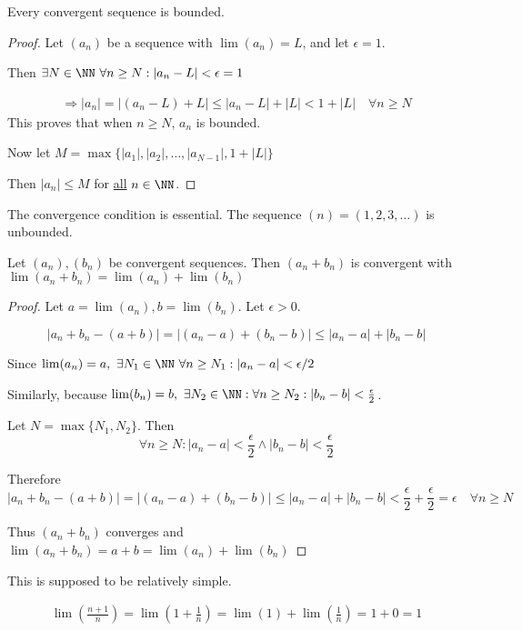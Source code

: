 \documentclass[class=scrartcl, crop=false]{standalone}
\begin{document}
\begin{theorem}
  Every convergent sequence is bounded.

  \begin{proof}
    Let $(a_n)$ be a sequence with $\lim(a_n) = L$, and let $\epsilon = 1$.

    Then $\exists N \in \NN \ \forall n \geq N: |a_n - L| < \epsilon = 1$

     \begin{gather*}
       \Rightarrow |a_n| = |(a_n - L) + L| \leq |a_n - L| + |L| < 1 + |L| \quad \forall n \geq N
    \end{gather*}
    This proves that when $n  \geq N$, $a_n$ is bounded. \newline

    Now let $M = \max\{|a_1|,|a_2|,\dots,|a_{N - 1}|,1 + |L|\}$

    Then $|a_n| \leq M$ for \ul{all} $n \in \NN$.
  \end{proof}
  \begin{remark}
    The convergence condition is essential. The sequence $(n) = (1, 2, 3, \dots)$ is unbounded.
  \end{remark}
\end{theorem}

\begin{theorem}
  Let $(a_n), (b_n)$ be convergent sequences. Then $(a_n + b_n)$ is convergent with $\lim(a_n + b_n) = \lim(a_n) + \lim(b_n)$
  \begin{proof}
    Let  $a = \lim(a_n), b = \lim(b_n).$ Let $\epsilon > 0$.

    \[|a_n + b_n - (a + b)| = |(a_n - a) + (b_n - b)| \leq |a_n - a| + |b_n - b|\]

    Since  $\lim(a_n) = a, \ \exists N_1 \in \NN \ \forall n \geq N_1: |a_n - a| < \epsilon / 2$ \newline

    Similarly, because $\lim(b_n) = b,\ \exists N_2 \in \NN: \forall n \geq N_2:|b_n - b| < \frac{\epsilon}{2}$.\newline

    Let $N = \max\{N_1, N_2\}$. Then
    \[
      \forall n \geq N: |a_n - a| < \frac{\epsilon}{2} \wedge |b_n - b| < \frac{\epsilon}{2}
    \] \newline

    Therefore
    \[|a_n + b_n - (a + b)| = |(a_n - a) + (b_n - b)| \leq |a_n - a| + |b_n - b| < \frac{\epsilon}{2} + \frac{\epsilon}{2} = \epsilon \quad \forall n \geq N\]\newline

    Thus $(a_n + b_n)$ converges and $\lim(a_n + b_n) = a + b = \lim(a_n) + \lim(b_n)$
  \end{proof}
  This is supposed to be relatively simple.
\end{theorem}
\begin{example}
  \begin{gather*}
    \lim(\frac{n + 1}{n}) = \lim(1 + \frac{1}{n}) = \lim(1) + \lim(\frac{1}{n}) = 1 + 0 = 1
  \end{gather*}
\end{example}
\end{document}
